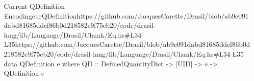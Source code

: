 \begin{haskell}{Current QDefinition Encoding}{curQDefinition}{https://github.com/JacquesCarette/Drasil/blob/ab9e091dabd81685ddef86b0d218582c9f75c\newline{}b20/code/drasil-lang/lib/Language/Drasil/Chunk/Eq.hs\#L34-L35}{https://github.com/JacquesCarette/Drasil/blob/ab9e091dabd81685ddef86b0d218582c9f75cb20/code/drasil-lang/lib/Language/Drasil/Chunk/Eq.hs\#L34-L35}
data QDefinition e where
  QD :: DefinedQuantityDict -> [UID] -> e -> QDefinition e
\end{haskell}
